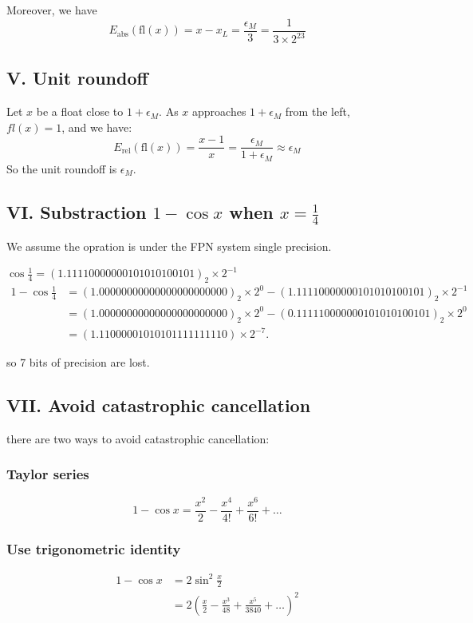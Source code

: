 \documentclass[a4paper]{article}
\newcommand{\esm}{\epsilon_M}
\newcommand{\fl}{\text{fl}}
\newcommand{\Eabs}{E_{\text{abs}}}
\newcommand{\Erel}{E_{\text{rel}}}
\begin{document}
Moreover, we have 
\[\Eabs(\fl(x)) = x- x_L = \frac{\esm}{3} = \frac{1}{3\times 2^{23}}\]

\subsection*{V. Unit roundoff}
Let $x$ be a float close to $1 + \esm$. As $x$ approaches $1 + \esm$ from the left, $fl(x) = 1$, and we have:
\[\Erel(\fl(x)) = \frac{x-1}{x} = \frac{\esm}{1 + \esm} \approx \esm\]
So the unit roundoff is $\esm$.

\subsection*{VI. Substraction $1 - \cos x$ when $x = \frac{1}{4}$}
We assume the opration is under the FPN system single precision.

$\cos \frac{1}{4} = (1.111 1000 0000 1010 1010 0101)_2 \times 2^{-1}$
\begin{align*}
  1 - \cos \frac{1}{4} &= (1.000 0000 0000 0000 0000 0000)_2 \times 2^0 - (1.111 1000 0000 1010 1010 0101)_2 \times 2^{-1}\\
&= (1.000 0000 0000 0000 0000 0000)_2 \times 2^0 - (0.1111 1000 0000 1010 1010 0101)_2 \times 2^{0}\\
&=(1.110 0000 1010 1011 1111 1110) \times 2^{-7}.
\end{align*}

so 7 bits of precision are lost.

\subsection*{VII. Avoid catastrophic cancellation}
there are two ways to avoid catastrophic cancellation:
\subsubsection*{Taylor series}
\[  1 - \cos x = \frac{x^2}{2} - \frac{x^4}{4!} + \frac{x^6}{6!} + \dots\]

\subsubsection*{Use trigonometric identity}
\begin{align*}
  1- \cos x &=  2\sin^2\frac{x}{2}\\
&= 2\left(\frac{x}{2} - \frac{x^3}{48} + \frac{x^5}{3840} + \dots\right)^2
\end{align*}
\end{document}

